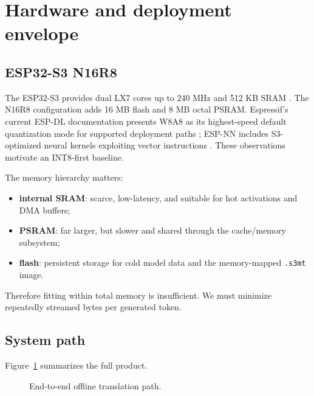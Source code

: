\documentclass{article}
\begin{document}
\section{Hardware and deployment envelope}
\subsection{ESP32-S3 N16R8}
The ESP32-S3 provides dual LX7 cores up to 240 MHz and 512 KB SRAM \citep{espressif_s3}. The N16R8 configuration adds 16 MB flash and 8 MB octal PSRAM. Espressif's current ESP-DL documentation presents W8A8 as its highest-speed default quantization mode for supported deployment paths \citep{espressif_espdl}; ESP-NN includes S3-optimized neural kernels exploiting vector instructions \citep{espressif_espnn}. These observations motivate an INT8-first baseline.

The memory hierarchy matters:
\begin{itemize}[leftmargin=*]
\item \textbf{internal SRAM}: scarce, low-latency, and suitable for hot activations and DMA buffers;
\item \textbf{PSRAM}: far larger, but slower and shared through the cache/memory subsystem;
\item \textbf{flash}: persistent storage for cold model data and the memory-mapped \texttt{.s3mt} image.
\end{itemize}
Therefore fitting within total memory is insufficient. We must minimize repeatedly streamed bytes per generated token.

\subsection{System path}
Figure~\ref{fig:path} summarizes the full product.

\begin{figure}[t]
\centering
{}
\caption{End-to-end offline translation path.}
\label{fig:path}
\end{figure}
\end{document}
